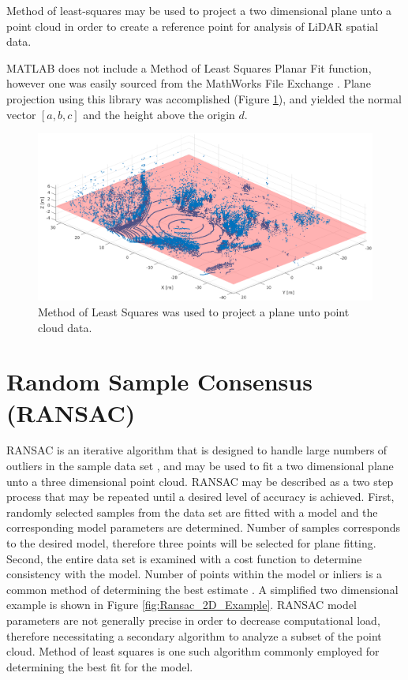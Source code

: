 \documentclass[numbered,pdftex]{ohio-etd}
\begin{document}
{{		{Method of least-squares may be used to project a two dimensional plane unto a point cloud in order to create a reference point for analysis of LiDAR spatial data.}
		
		{MATLAB does not include a Method of Least Squares Planar Fit function, however one was easily sourced from the MathWorks File Exchange \cite{noauthor_object-oriented_nodate}. Plane projection using this library was accomplished (Figure \ref{fig:Method_Least_Squares_Plane_Proj}), and yielded the normal vector $[a,b,c]$ and the height above the origin $d$.}

		\begin{figure}[H]
			\centering
			\includegraphics[width=0.7\linewidth]{Defense_Images/Method_Least_Squares_Plane_Proj.png}
			\caption[Method of Least Squares Plane Projection Example]{Method of Least Squares was used to project a plane unto point cloud data.}
			\label{fig:Method_Least_Squares_Plane_Proj}
		\end{figure}
		
	} %
	
	\section{Random Sample Consensus (RANSAC)}{
	
		{RANSAC is an iterative algorithm that is designed to handle large numbers of outliers in the sample data set \cite{derpanis_overview_nodate,yaniv_random_2010,fischler_random_1987,cantzler_random_nodate}, and may be used to fit a two dimensional plane unto a three dimensional point cloud. RANSAC may be described as a two step process that may be repeated until a desired level of accuracy is achieved. First, randomly selected samples from the data set are fitted with a model and the corresponding model parameters are determined. Number of samples corresponds to the desired model, therefore three points will be selected for plane fitting. Second, the entire data set is examined with a cost function to determine consistency with the model. Number of points within the model or inliers is a common method of determining the best estimate \cite{cantzler_random_nodate}. A simplified two dimensional example is shown in Figure \ref{fig:Ransac_2D_Example}. RANSAC model parameters are not generally precise in order to decrease computational load, therefore necessitating a secondary algorithm to analyze a subset of the point cloud. Method of least squares is one such algorithm commonly employed for determining the best fit for the model.}

}}
\end{document}
